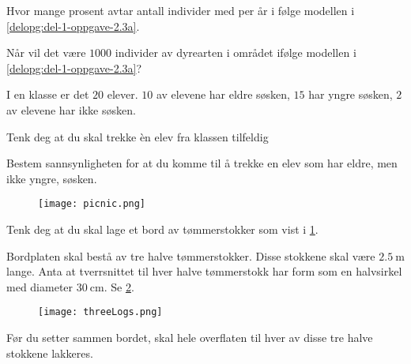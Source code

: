 \begin{oppgaver}
   Hvor mange prosent avtar antall individer med per år i følge
    modellen i \cref{delopg:del-1-oppgave-2.3a}.
\end{oppgaver}

\begin{oppgaver}
   Når vil det være $\num{1000}$ individer av dyrearten i området
    ifølge modellen i \cref{delopg:del-1-oppgave-2.3a}?
\end{oppgaver}


\Oppgave[2] 

I en klasse er det $20$ elever. $10$ av elevene har eldre søsken, $15$ har yngre
søsken, $2$ av elevene har ikke søsken. \bigskip

Tenk deg at du skal trekke èn elev fra klassen tilfeldig \bigskip

Bestem sannsynligheten for at du komme til å trekke en elev som har eldre, men
ikke yngre, søsken.


\Oppgave[3] 

\begin{figure}[H]
  \centering
  \texttt{[image: picnic.png]}
  \caption{}
  \label{fig:del-2-oppgave-2.5a}
\end{figure}

Tenk deg at du skal lage et bord av tømmerstokker som vist i
\cref{fig:del-2-oppgave-2.5a}. \bigskip

Bordplaten skal bestå av tre halve tømmerstokker. Disse stokkene skal være
$\SI{2.5}{\m}$ lange. Anta at tverrsnittet til hver halve tømmerstokk har form
som en halvsirkel med diameter $\SI{30}{\cm}$. Se \cref{fig:del-2-oppgave-2.5b}.


\begin{figure}[H]
  \centering
  \texttt{[image: threeLogs.png]}
  \caption{}
  \label{fig:del-2-oppgave-2.5b}
\end{figure}

Før du setter sammen bordet, skal hele overflaten til hver av disse tre halve
stokkene lakkeres. \bigskip

